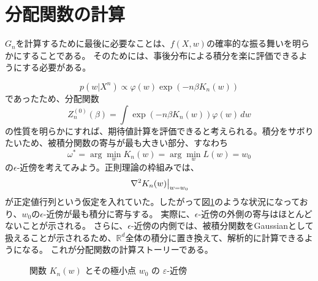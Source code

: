 \documentclass[dvipdfmx]{jsarticle}
\begin{document}
\section{分配関数の計算}
$G_n$を計算するために最後に必要なことは、$f(X,w)$の確率的な振る舞いを明らかにすることである。
そのためには、事後分布による積分を楽に評価できるようにする必要がある。

\begin{equation}
    p(w|X^n) \propto \varphi(w)\exp(-n\beta K_n(w))
\end{equation}
であったため、分配関数
\begin{equation}
    Z_n^{(0)}(\beta) = \int\exp(-n\beta K_n(w))\varphi(w)\,dw
\end{equation}
の性質を明らかにすれば、期待値計算を評価できると考えられる。積分をサボりたいため、被積分関数の寄与が最も大きい部分、すなわち
\begin{equation}
    \omega^* = \arg\min_{w} K_n(w) = \arg\min_{w} L(w) = w_0
\end{equation}
の$\epsilon\text{-}$近傍を考えてみよう。正則理論の枠組みでは、
\begin{equation}
    \left.\laplacian{K_n(w)}\right|_{w=w_0}
\end{equation}
が正定値行列という仮定を入れていた。したがって図\ref{fig:spiky-kn}のような状況になっており、$w_0$の$\epsilon\text{-}$近傍が最も積分に寄与する。
実際に、$\epsilon\text{-}$近傍の外側の寄与はほとんどないことが示される。
さらに、$\epsilon\text{-}$近傍の内側では、被積分関数をGaussianとして扱えることが示されるため、$\mathbb{R}^d$全体の積分に置き換えて、解析的に計算できるようになる。
これが分配関数の計算ストーリーである。

\begin{figure}[H]
\centering
{}
\caption{関数 $K_n(w)$ とその極小点 $w_0$ の $\varepsilon\text{-}$近傍}
\label{fig:spiky-kn}
\end{figure}
\end{document}
